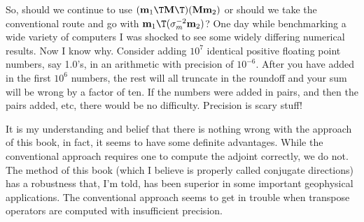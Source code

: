 \par
So, should we continue to use
$(\bold m_1\T \bold M\T) (\bold M \bold m_2)$
or should we take the conventional route and go with
$\bold m_1\T (\bold\sigma_m^{-2} \bold m_2)$?
One day while benchmarking a wide variety of computers I was shocked
to see some widely differing numerical results.  Now I know why.
Consider adding $10^7$ identical positive floating point numbers, say 1.0's,
in an arithmetic with precision of $10^{-6}$.
After you have added in the first $10^6$ numbers,
the rest will all truncate in the roundoff
and your sum will be wrong by a factor of ten.
If the numbers were added in pairs,
and then the pairs added, etc, there would be no difficulty.
Precision is scary stuff!

\par
It is my understanding and belief that there is nothing wrong
with the approach of this book, in fact,
it seems to have some definite advantages.
While the conventional approach requires one
to compute the adjoint correctly, we do not.
The method of this book
(which I believe is properly called conjugate directions)
has a robustness that, I'm told,
has been superior in some important geophysical applications.
The conventional approach seems to get in trouble when
transpose operators are computed with insufficient precision.







\unboldmath


\clearpage
